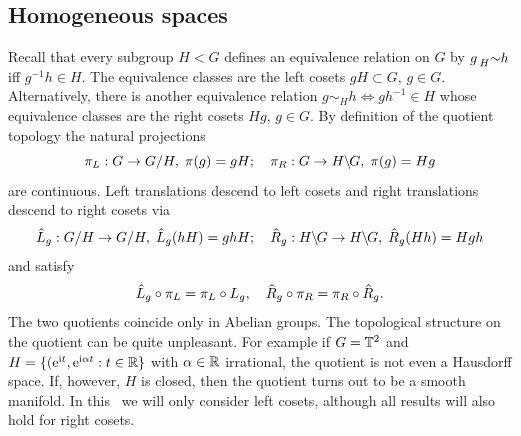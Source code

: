\subsection{Homogeneous spaces}\label{sec: homogeneous spaces}

Recall that every subgroup  $H<G$ defines an equivalence relation on $G$ by $g\prescript{}{H}{\sim}h$ iff $g^{-1}h\in H$. The equivalence classes are the left cosets $gH\subset G$, $g\in G$. Alternatively, there is another equivalence relation $g\sim_H h\Leftrightarrow gh^{-1}\in H$ whose equivalence classes are the right cosets $Hg$, $g\in G$.  By definition of the quotient topology the natural projections
\[\pi_L:G\to G\slash H,\;\pi(g)=gH;\quad \pi_R:G\to H\mkern-.5mu\backslash\mkern-2mu G,\;\pi(g)=Hg\]
are continuous. Left translations descend to left cosets and right translations descend to right cosets via
\[\wh{L}_g:G\slash H\to G\slash H,\; \wh{L}_g(hH)=ghH;\quad \wh{R}_g: H\bslash G\to H\bslash G,\; \wh{R}_g(Hh)=Hgh\]
and satisfy
\[\wh{L}_g\circ \pi_L=\pi_L\circ L_g,\quad \wh{R}_g\circ \pi_R=\pi_R\circ \wh{R}_g.\]
The two quotients coincide only in Abelian groups. The topological structure on the quotient can be quite unpleasant. For example if $G=\mathbb{T}^2$ and $H=\{(\mathrm{e}^{\mathrm{i} t},\mathrm{e}^{\mathrm{i}\alpha t}:t\in \mathbb{R}\}$ with $\alpha \in\mathbb{R}$ irrational, the quotient is not even a Hausdorff space. If, however, $H$ is closed, then the quotient turns out to be a smooth manifold. In this \subsect\ we will only consider left cosets, although all results will also hold for right cosets. 


